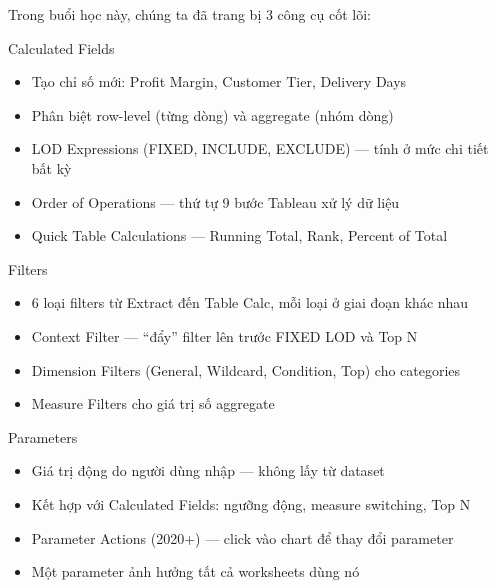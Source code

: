 \documentclass[12pt]{article}
\begin{document}
\noindent Trong buổi học này, chúng ta đã trang bị 3 công cụ cốt lõi:

\begin{conceptbox}{Calculated Fields}
\begin{itemize}[nosep]
    \item Tạo chỉ số mới: Profit Margin, Customer Tier, Delivery Days
    \item Phân biệt row-level (từng dòng) và aggregate (nhóm dòng)
    \item LOD Expressions (FIXED, INCLUDE, EXCLUDE) --- tính ở mức chi tiết bất kỳ
    \item Order of Operations --- thứ tự 9 bước Tableau xử lý dữ liệu
    \item Quick Table Calculations --- Running Total, Rank, Percent of Total
\end{itemize}
\end{conceptbox}

\begin{conceptbox}{Filters}
\begin{itemize}[nosep]
    \item 6 loại filters từ Extract đến Table Calc, mỗi loại ở giai đoạn khác nhau
    \item Context Filter --- ``đẩy'' filter lên trước FIXED LOD và Top N
    \item Dimension Filters (General, Wildcard, Condition, Top) cho categories
    \item Measure Filters cho giá trị số aggregate
\end{itemize}
\end{conceptbox}

\begin{conceptbox}{Parameters}
\begin{itemize}[nosep]
    \item Giá trị động do người dùng nhập --- không lấy từ dataset
    \item Kết hợp với Calculated Fields: ngưỡng động, measure switching, Top N
    \item Parameter Actions (2020+) --- click vào chart để thay đổi parameter
    \item Một parameter ảnh hưởng tất cả worksheets dùng nó
\end{itemize}
\end{conceptbox}

\newpage
\end{document}
